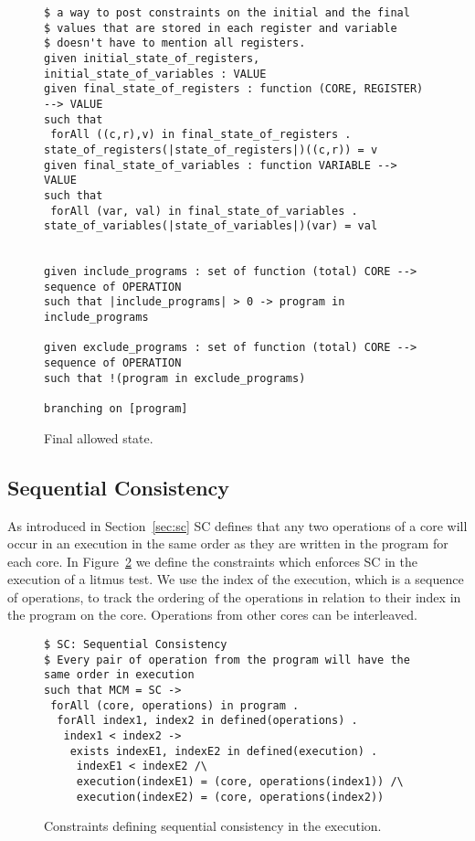 \documentclass[runningheads]{llncs}
\begin{document}
\begin{figure}
\begin{lstlisting}
$ a way to post constraints on the initial and the final
$ values that are stored in each register and variable
$ doesn't have to mention all registers.
given initial_state_of_registers, initial_state_of_variables : VALUE
given final_state_of_registers : function (CORE, REGISTER) --> VALUE
such that
 forAll ((c,r),v) in final_state_of_registers . state_of_registers(|state_of_registers|)((c,r)) = v
given final_state_of_variables : function VARIABLE --> VALUE
such that
 forAll (var, val) in final_state_of_variables . state_of_variables(|state_of_variables|)(var) = val


given include_programs : set of function (total) CORE --> sequence of OPERATION
such that |include_programs| > 0 -> program in include_programs

given exclude_programs : set of function (total) CORE --> sequence of OPERATION
such that !(program in exclude_programs)

branching on [program]
\end{lstlisting}
\caption{Final allowed state.\label{fig:essence6}}
\end{figure}




\subsection{Sequential Consistency}
As introduced in Section~\ref{sec:sc} SC defines that any two operations of a core will occur in an execution in the same order as they are written in the program for each core.
In Figure~\ref{fig:essenceSC} we define the constraints which enforces SC in the execution of a litmus test.
We use the index of the execution, which is a sequence of operations, to track the ordering of the operations in relation to their index in the program on the core.
Operations from other cores can be interleaved.

\begin{figure}
\begin{lstlisting}
$ SC: Sequential Consistency
$ Every pair of operation from the program will have the same order in execution
such that MCM = SC ->
 forAll (core, operations) in program .
  forAll index1, index2 in defined(operations) .
   index1 < index2 ->
    exists indexE1, indexE2 in defined(execution) .
     indexE1 < indexE2 /\
     execution(indexE1) = (core, operations(index1)) /\
     execution(indexE2) = (core, operations(index2))
\end{lstlisting}
\caption{Constraints defining sequential consistency in the execution. \label{fig:essenceSC}}
\end{figure}
\end{document}
